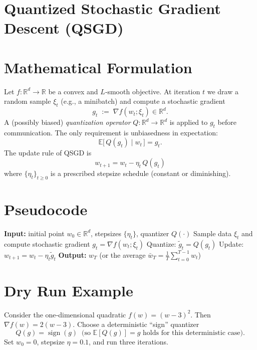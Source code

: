 \documentclass{article}
\begin{document}
\section*{Quantized Stochastic Gradient Descent (QSGD)}

\section*{Mathematical Formulation}
Let $f:\mathbb{R}^d\rightarrow\mathbb{R}$ be a convex and $L$‑smooth objective.  
At iteration $t$ we draw a random sample $\xi_t$ (e.g., a minibatch) and compute a stochastic gradient
\[
g_t \;:=\; \nabla f(w_t;\xi_t)\in\mathbb{R}^d .
\]
A (possibly biased) \emph{quantization operator} $Q:\mathbb{R}^d\rightarrow\mathbb{R}^d$ is applied to $g_t$ before communication.  
The only requirement is unbiasedness in expectation:
\[
\mathbb{E}\!\big[\,Q(g_t)\mid w_t\,\big]=g_t . \tag{1}
\]
The update rule of QSGD is
\[
\boxed{ \; w_{t+1}=w_t-\eta_t\, Q(g_t) \; } \tag{2}
\]
where $\{\eta_t\}_{t\ge 0}$ is a prescribed stepsize schedule (constant or diminishing).

\section*{Pseudocode}
\begin{algorithm}[H]
\caption{Quantized Stochastic Gradient Descent}
\begin{algorithmic}[1]
\STATE \textbf{Input:} initial point $w_0\in\mathbb{R}^d$, stepsizes $\{\eta_t\}$, quantizer $Q(\cdot)$
    \STATE Sample data $\xi_t$ and compute stochastic gradient $g_t=\nabla f(w_t;\xi_t)$
    \STATE Quantize: $\tilde g_t = Q(g_t)$
    \STATE Update: $w_{t+1}= w_t - \eta_t \tilde g_t$
\ENDFOR
\STATE \textbf{Output:} $w_T$ (or the average $\bar w_T=\frac1T\sum_{t=0}^{T-1}w_t$)
\end{algorithmic}
\end{algorithm}

\section*{Dry Run Example}
Consider the one‑dimensional quadratic $f(w)=(w-3)^2$.  
Then $\nabla f(w)=2(w-3)$.  
Choose a deterministic “sign” quantizer
\[
Q(g)=\operatorname{sign}(g)\;\;\text{(so } \mathbb{E}[Q(g)]=g \text{ holds for this deterministic case)}.
\]
Set $w_0=0$, stepsize $\eta=0.1$, and run three iterations.
\end{document}
